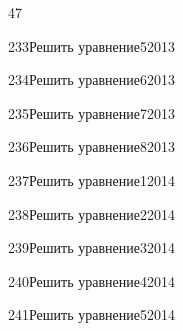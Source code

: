 \begin{TrigSourcePage}{47}
\begin{TrigExercise}{233}{Решить уравнение}{5}{2013}
\end{TrigExercise}
\begin{TrigExercise}{234}{Решить уравнение}{6}{2013}
\end{TrigExercise}
\begin{TrigExercise}{235}{Решить уравнение}{7}{2013}
\end{TrigExercise}
\begin{TrigExercise}{236}{Решить уравнение}{8}{2013}
\end{TrigExercise}
\begin{TrigExercise}{237}{Решить уравнение}{1}{2014}
\end{TrigExercise}
\begin{TrigExercise}{238}{Решить уравнение}{2}{2014}
\end{TrigExercise}
\begin{TrigExercise}{239}{Решить уравнение}{3}{2014}
\end{TrigExercise}
\begin{TrigExercise}{240}{Решить уравнение}{4}{2014}
\end{TrigExercise}
\begin{TrigExercise}{241}{Решить уравнение}{5}{2014}

\end{TrigExercise}
\end{TrigSourcePage}
